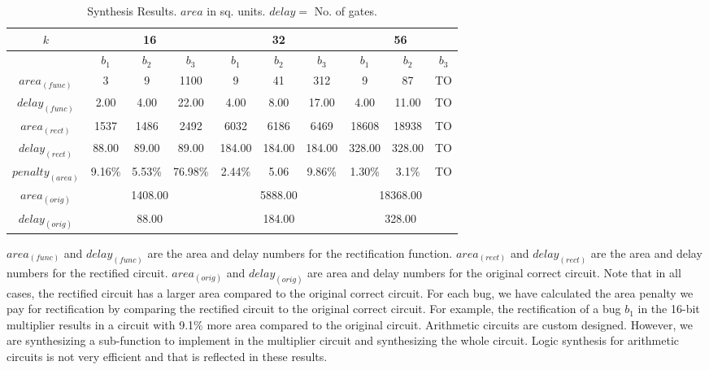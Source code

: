   \begin{table*}
{
    \begin{tabular}{| c | c | c | c | c | c | c | c | c | c |}
    \hline
    $k$ & \multicolumn{3}{c|}{16} & \multicolumn{3}{c|}{32} & \multicolumn{3}{c|}{56} \\ \hline
        & $b_1$ & $b_2$ & $b_3$ & $b_1$ & $b_2$ & $b_3$ & $b_1$ & $b_2$ & $b_3$ \\ \hline 
    $area_{(func)}$ & 3 & 9 & 1100 & 9 & 41 & 312 & 9 & 87 & TO \\ \hline
   $delay_{(func)}$ & 2.00 & 4.00 & 22.00 & 4.00 & 8.00 & 17.00 & 4.00 & 11.00 & TO \\ \hline     
    $area_{(rect)}$ & 1537 & 1486 & 2492 & 6032 & 6186 & 6469 & 18608 & 18938 & TO \\ \hline     
    $delay_{(rect)}$ & 88.00 & 89.00 & 89.00 & 184.00 & 184.00 & 184.00 & 328.00 & 328.00 & TO \\ \hline  
    $penalty_{(area)}$ & 9.16\% & 5.53\% & 76.98\% & 2.44\% & 5.06 & 9.86\% & 1.30\% & 3.1\% & TO \\ \hline
    $area_{(orig)}$ & \multicolumn{3}{c|}{1408.00} & \multicolumn{3}{c|}{5888.00} & \multicolumn{3}{c|}{18368.00} \\ \hline 
    
    $delay_{(orig)}$ & \multicolumn{3}{c|}{88.00} & \multicolumn{3}{c|}{184.00} & \multicolumn{3}{c|}{328.00} \\ \hline
    
    \end{tabular}
    \caption{Synthesis Results. $area$ in sq. units. $delay = $ No. of gates.}
    \label{tb:synth}
}
\end{table*}


$area_{(func)}$ and $delay_{(func)}$ are the area and delay numbers for the rectification function. $area_{(rect)}$ and $delay_{(rect)}$ are the area and delay numbers for the rectified circuit. $area_{(orig)}$ and $delay_{(orig)}$ are area and delay numbers for the original correct circuit. Note that in all cases, the rectified circuit has a larger area compared to the original correct circuit. For each bug, we have calculated the area penalty we pay for rectification by comparing the rectified circuit to the original correct circuit. For example, the rectification of a bug $b_1$ in the 16-bit multiplier results in a circuit with 9.1\% more area compared to the original circuit. Arithmetic circuits are custom designed. However, we are synthesizing a sub-function to implement in the multiplier circuit and synthesizing the whole circuit. Logic synthesis for arithmetic circuits is not very efficient and that is reflected in these results. 

